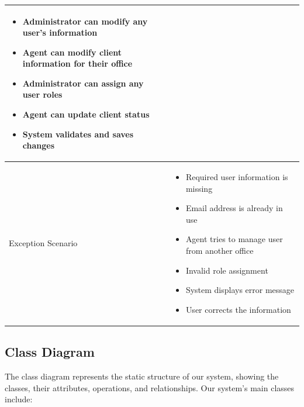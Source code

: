 \begin{table}[H]
\begin{tabular}{|p{3cm}|p{12cm}|}
\begin{itemize}
            \item Administrator can modify any user's information
            \item Agent can modify client information for their office
            \item Administrator can assign any user roles
            \item Agent can update client status
            \item System validates and saves changes
        \end{itemize} \\
        \hline
        Exception Scenario & \begin{itemize}
            \item Required user information is missing
            \item Email address is already in use
            \item Agent tries to manage user from another office
            \item Invalid role assignment
            \item System displays error message
            \item User corrects the information
        \end{itemize} \\
        \hline
    \end{tabular}
    \vspace{0.5cm}
\end{table}

\subsection{Class Diagram}
The class diagram represents the static structure of our system, showing the classes, their attributes, operations, and relationships. Our system's main classes include:

